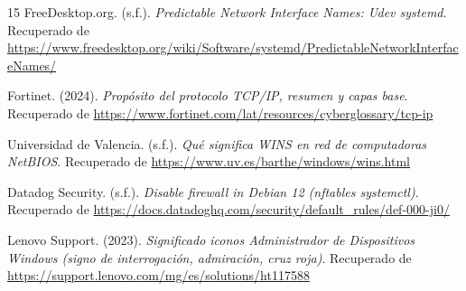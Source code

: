 \documentclass[a4paper,12pt]{article}
\begin{document}
\begin{thebibliography}{15}
 FreeDesktop.org. (s.f.). \textit{Predictable Network Interface Names: Udev systemd}. Recuperado de \url{https://www.freedesktop.org/wiki/Software/systemd/PredictableNetworkInterfaceNames/}

 Fortinet. (2024). \textit{Propósito del protocolo TCP/IP, resumen y capas base}. Recuperado de \url{https://www.fortinet.com/lat/resources/cyberglossary/tcp-ip}

 Universidad de Valencia. (s.f.). \textit{Qué significa WINS en red de computadoras NetBIOS}. Recuperado de \url{https://www.uv.es/barthe/windows/wins.html}

 Datadog Security. (s.f.). \textit{Disable firewall in Debian 12 (nftables systemctl)}. Recuperado de \url{https://docs.datadoghq.com/security/default_rules/def-000-ji0/}

 Lenovo Support. (2023). \textit{Significado iconos Administrador de Dispositivos Windows (signo de interrogación, admiración, cruz roja)}. Recuperado de \url{https://support.lenovo.com/mg/es/solutions/ht117588}

\end{thebibliography}
\end{document}
